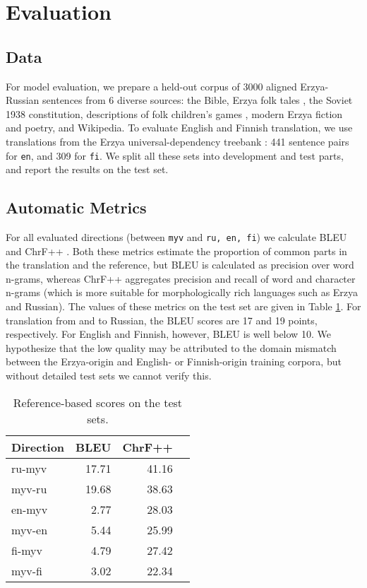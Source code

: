 \documentclass[11pt]{article}
\begin{document}
\section{Evaluation}
\subsection{Data}
For model evaluation, we prepare a held-out corpus of 3000 aligned Erzya-Russian sentences from 6 diverse sources: the Bible, Erzya folk tales \cite{sheyanova2017}, the Soviet 1938 constitution, descriptions of folk children's games \cite{bryzhinsky2009}, modern Erzya fiction and poetry, and Wikipedia. To evaluate English and Finnish translation, we use translations from the Erzya universal-dependency treebank \cite{rueter-tyers-2018-towards}: 441 sentence pairs for \texttt{en}, and 309 for \texttt{fi}. We split all these sets into development and test parts, and report the results on the test set.

\subsection{Automatic Metrics}
For all evaluated directions (between \texttt{myv} and \texttt{ru, en, fi}) we calculate BLEU \cite{papineni-etal-2002-bleu} and ChrF++ \cite{popovic-2017-chrf}. Both these metrics estimate the proportion of common parts in the translation and the reference, but BLEU is calculated as precision over word n-grams, whereas ChrF++ aggregates precision and recall of word and character n-grams (which is more suitable for morphologically rich languages such as Erzya and Russian).
The values of these metrics on the test set are given in Table \ref{tab:bleu}. For translation from and to Russian, the BLEU scores are 17 and 19 points, respectively. For English and Finnish, however, BLEU is well below 10. We hypothesize that the low quality may be attributed to the domain mismatch between the Erzya-origin and English- or Finnish-origin training corpora, but without detailed test sets we cannot verify this.


\begin{table}
\small
\centering
\begin{tabular}{l|rrr}
\hline
\textbf{Direction} & \textbf{BLEU} & \textbf{ChrF++} \\
\hline
ru-myv & 17.71 & 41.16 \\
myv-ru & 19.68 & 38.63 \\
en-myv & 2.77 & 28.03 \\
myv-en & 5.44 & 25.99 \\ 
fi-myv & 4.79 & 27.42 \\
myv-fi & 3.02 & 22.34 \\
\hline
\end{tabular}
\caption{\label{tab:bleu} Reference-based scores on the test sets.}
\end{table}
\end{document}

